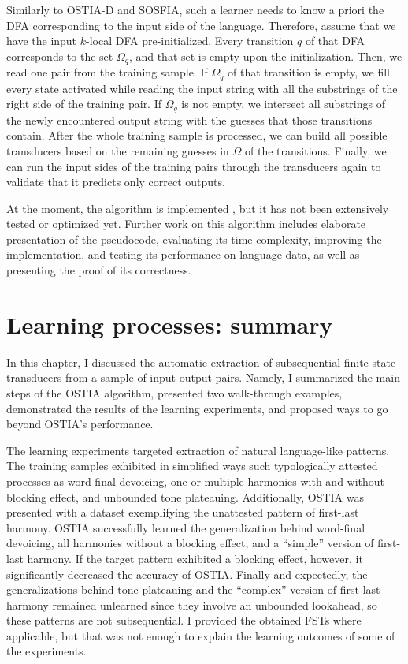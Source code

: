 Similarly to OSTIA-D and SOSFIA, such a learner needs to know a priori the DFA corresponding to the input side of the language.
Therefore, assume that we have the input $k$-local DFA pre-initialized.
Every transition $q$ of that DFA corresponds to the set $\Omega_q$, and that set is empty upon the initialization.
Then, we read one pair from the training sample.
If $\Omega_q$ of that transition is empty, we fill every state activated while reading the input string with all the substrings of the right side of the training pair.
If $\Omega_q$ is not empty, we intersect all substrings of the newly encountered output string with the guesses that those transitions contain.
After the whole training sample is processed, we can build all possible transducers based on the remaining guesses in $\Omega$ of the transitions.
Finally, we can run the input sides of the training pairs through the transducers again to validate that it predicts only correct outputs.

At the moment, the algorithm is implemented \href{https://github.com/alenaks/subregular-experiments/blob/master/ISL_group_learner.ipynb}{\faGithub} \citep{GHbrutefst}, but it has not been extensively tested or optimized yet.
Further work on this algorithm includes elaborate presentation of the pseudocode, evaluating its time complexity, improving the implementation, and testing its performance on language data, as well as presenting the proof of its correctness.


\section{Learning processes: summary}

In this chapter, I discussed the automatic extraction of subsequential finite-state transducers from a sample of input-output pairs.
Namely, I summarized the main steps of the OSTIA algorithm, presented two walk-through examples, demonstrated the results of the learning experiments, and proposed ways to go beyond OSTIA's performance.

The learning experiments targeted extraction of natural language-like patterns.
The training samples exhibited in simplified ways such typologically attested processes as word-final devoicing, one or multiple harmonies with and without blocking effect, and unbounded tone plateauing.
Additionally, OSTIA was presented with a dataset exemplifying the unattested pattern of first-last harmony.
OSTIA successfully learned the generalization behind word-final devoicing, all harmonies without a blocking effect, and a ``simple'' version of first-last harmony.
If the target pattern exhibited a blocking effect, however, it significantly decreased the accuracy of OSTIA.
Finally and expectedly, the generalizations behind tone plateauing and the ``complex'' version of first-last harmony remained unlearned since they involve an unbounded lookahead, so these patterns are not subsequential.
I provided the obtained FSTs where applicable, but that was not enough to explain the learning outcomes of some of the experiments.


